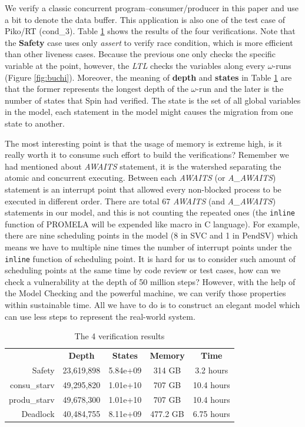 We verify a classic concurrent program--consumer/producer in this paper and use a bit to denote the data buffer. This application is also one of the test case of Piko/RT (cond\_3). Table \ref{tab:verification} shows the results of the four verifications. Note that the \textbf{Safety} case uses only \textit{assert} to verify race condition, which is more efficient than other liveness cases. Because the previous one only checks the specific variable at the point, however, the \textit{LTL} checks the variables along every $\omega$-runs (Figure \ref{fig:buchi}). Moreover, the meaning of \textbf{depth} and \textbf{states} in Table \ref{tab:verification} are that the former represents the longest depth of the $\omega$-run and the later is the number of states that Spin had verified. The state is the set of all global variables in the model, each statement in the model might causes the migration from one state to another.

The most interesting point is that the usage of memory is extreme high, is it really worth it to consume such effort to build the verifications? Remember we had mentioned about \textit{AWAITS} statement, it is the watershed separating the atomic and concurrent executing. Between each \textit{AWAITS} (or \textit{A\_AWAITS}) statement is an interrupt point that allowed every non-blocked process to be executed in different order. There are total 67 \textit{AWAITS} (and \textit{A\_AWAITS}) statements in our model, and this is not counting the repeated ones (the \texttt{inline} function of PROMELA will be expended like macro in C language). For example, there are nine scheduling points in the model (8 in SVC and 1 in PendSV) which means we have to multiple nine times the number of interrupt points under the \texttt{inline} function of scheduling point. It is hard for us to consider such amount of scheduling points at the same time by code review or test cases, how can we check a vulnerability at the depth of 50 million steps? However, with the help of the Model Checking and the powerful machine, we can verify those properties within sustainable time. All we have to do is to construct an elegant model which can use less steps to represent the real-world system.

\begin{table}
\caption{The 4 verification results}
\label{tab:verification}
\begin{tabular}{rcccc}
\toprule
 & \textbf{Depth} & \textbf{States} & \textbf{Memory} & \textbf{Time} \\
 \cmidrule{2-5}
Safety & 23,619,898 & 5.84e+09 & 314 GB & 3.2 hours \\
 \cmidrule{2-5}
consu\_starv & 49,295,820 & 1.01e+10 & 707 GB & 10.4 hours \\
 \cmidrule{2-5}
produ\_starv & 49,678,300 & 1.01e+10 & 707 GB & 10.4 hours \\
 \cmidrule{2-5}
Deadlock & 40,484,755 & 8.11e+09 & 477.2 GB & 6.75 hours \\
\bottomrule
\end{tabular}
\end{table}

